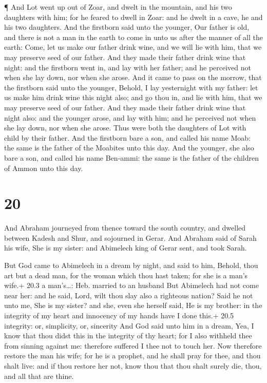  ¶ And Lot went up out of Zoar, and dwelt in the mountain,
and his two daughters with him; for he feared to dwell in Zoar: and he
dwelt in a cave, he and his two daughters.  And the
firstborn said unto the younger, Our father is old, and there is not a
man in the earth to come in unto us after the manner of all the earth:
 Come, let us make our father drink wine, and we will lie
with him, that we may preserve seed of our father.  And
they made their father drink wine that night: and the firstborn went in,
and lay with her father; and he perceived not when she lay down, nor
when she arose.  And it came to pass on the morrow, that
the firstborn said unto the younger, Behold, I lay yesternight with my
father: let us make him drink wine this night also; and go thou in, and
lie with him, that we may preserve seed of our father.  And
they made their father drink wine that night also: and the younger
arose, and lay with him; and he perceived not when she lay down, nor
when she arose.  Thus were both the daughters of Lot with
child by their father.  And the firstborn bare a son, and
called his name Moab: the same is the father of the Moabites unto this
day.  And the younger, she also bare a son, and called his
name Ben-ammi: the same is the father of the children of Ammon unto this
day.

\hypertarget{section-19}{%
\section{20}\label{section-19}}

 And Abraham journeyed from thence toward the south country,
and dwelled between Kadesh and Shur, and sojourned in Gerar.
 And Abraham said of Sarah his wife, She is my sister: and
Abimelech king of Gerar sent, and took Sarah.

 But God came to Abimelech in a dream by night, and said to
him, Behold, thou art but a dead man, for the woman which thou hast
taken; for she is a man's wife.+ 20.3 a man's\ldots: Heb. married to an
husband  But Abimelech had not come near her: and he said,
Lord, wilt thou slay also a righteous nation?  Said he not
unto me, She is my sister? and she, even she herself said, He is my
brother: in the integrity of my heart and innocency of my hands have I
done this.+ 20.5 integrity: or, simplicity, or, sincerity 
And God said unto him in a dream, Yea, I know that thou didst this in
the integrity of thy heart; for I also withheld thee from sinning
against me: therefore suffered I thee not to touch her.  Now
therefore restore the man his wife; for he is a prophet, and he shall
pray for thee, and thou shalt live: and if thou restore her not, know
thou that thou shalt surely die, thou, and all that are thine.

